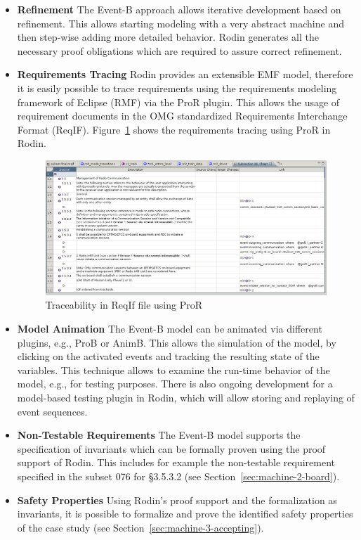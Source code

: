 \documentclass{template/openetcs_article}
\begin{document}
\begin{itemize}
\item {\bf Refinement} The Event-B approach allows iterative development based
  on refinement. This allows starting modeling with a very abstract machine and
  then step-wise adding more detailed behavior. Rodin generates all the
  necessary proof obligations which are required to assure correct refinement.
\item {\bf Requirements Tracing} Rodin provides an extensible EMF model,
  therefore it is easily possible to trace requirements using the requirements
  modeling framework of Eclipse (RMF) via the ProR plugin. This allows the usage
  of requirement documents in the OMG standardized Requirements Interchange
  Format (ReqIF). Figure~\ref{fig:traceability-pror} shows the requirements
  tracing using ProR in Rodin.
  \begin{figure}[ht]
    \centering
    \includegraphics[width=\textwidth]{ReqIfinRodin}
    \caption{Traceability in ReqIf file using ProR}
    \label{fig:traceability-pror}
  \end{figure}
\item {\bf Model Animation} The Event-B model can be animated via different
  plugins, e.g., ProB or AnimB. This allows the simulation of the model, by
  clicking on the activated events and tracking the resulting state of the
  variables. This technique allows to examine the run-time behavior of the
  model, e.g., for testing purposes. There is also ongoing development for a
  model-based testing plugin in Rodin, which will allow storing and replaying of
  event sequences.
\item {\bf Non-Testable Requirements} The Event-B model supports the
  specification of invariants which can be formally proven using the proof
  support of Rodin. This includes for example the non-testable requirement
  specified in the subset 076 for §3.5.3.2 (see
  Section~\ref{sec:machine-2-board}).
\item {\bf Safety Properties} Using Rodin's proof support and the formalization
  as invariants, it is possible to formalize and prove the identified safety
  properties of the case study (see Section~\ref{sec:machine-3-accepting}).
\end{itemize}
\end{document}
